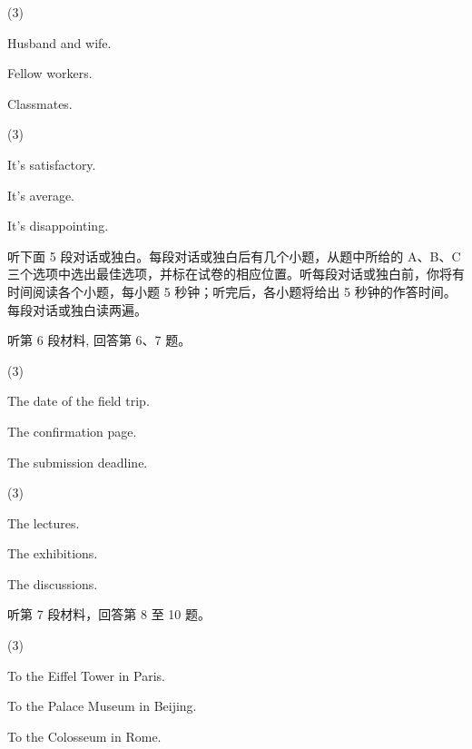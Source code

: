 \documentclass{英语试卷}
\begin{document}
\begin{choices}(3)
  \item Husband and wife.
  \item Fellow workers.
  \item Classmates.
\end{choices}
\begin{choices}(3)
  \item It's satisfactory.
  \item It's average.
  \item It's disappointing.
\end{choices}
\par 听下面 5 段对话或独白。每段对话或独白后有几个小题，从题中所给的 A、B、C 三个选项中选出最佳选项，并标在试卷的相应位置。听每段对话或独白前，你将有时间阅读各个小题，每小题 5 秒钟；听完后，各小题将给出 5 秒钟的作答时间。每段对话或独白读两遍。\par
\par 听第 6 段材料, 回答第 6、7 题。\par
{}
\begin{choices}(3)
  \item The date of the field trip.
  \item The confirmation page.
  \item The submission deadline.
\end{choices}
\begin{choices}(3)
  \item The lectures.
  \item The exhibitions.
  \item The discussions.
\end{choices}
\par 听第 7 段材料，回答第 8 至 10 题。\par
{}
\begin{choices}(3)
  \item To the Eiffel Tower in Paris.
  \item To the Palace Museum in Beijing.
  \item To the Colosseum in Rome.
\end{choices}
\end{document}
